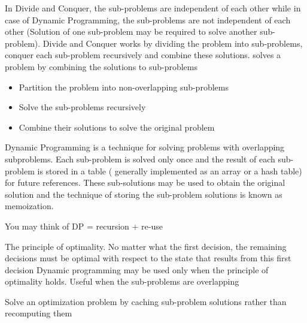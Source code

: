 \documentclass[a4paper,11pt,twoside]{book}
\begin{document}
	\par In Divide and Conquer, the sub-problems are independent of each other while in case of Dynamic Programming, the sub-problems are not independent of each other (Solution of one sub-problem may be required to solve another sub-problem). Divide and Conquer works by dividing the problem into sub-problems, conquer each sub-problem recursively and combine these solutions. solves a problem by combining the solutions to sub-problems
	
	\begin{itemize}
		\item Partition the problem into non-overlapping sub-problems
		
		\item Solve the sub-problems recursively
		
		\item Combine their solutions to solve the original problem
	\end{itemize}
	
	
	\par Dynamic Programming is a technique for solving problems with overlapping subproblems. Each sub-problem is solved only once and the result of each sub-problem is stored in a table ( generally implemented as an array or a hash table) for future references. These sub-solutions may be used to obtain the original solution and the technique of storing the sub-problem solutions is known as memoization.
	
	\par You may think of DP = recursion + re-use
	
	
	\par The principle of optimality. No matter what the first decision, the remaining decisions must be optimal with respect to the state that results from this first decision
	Dynamic programming may be used only when the principle of optimality holds. Useful when the sub-problems are overlapping
	
	Solve an optimization problem by caching  sub-problem solutions rather than recomputing them
	
\end{document}
